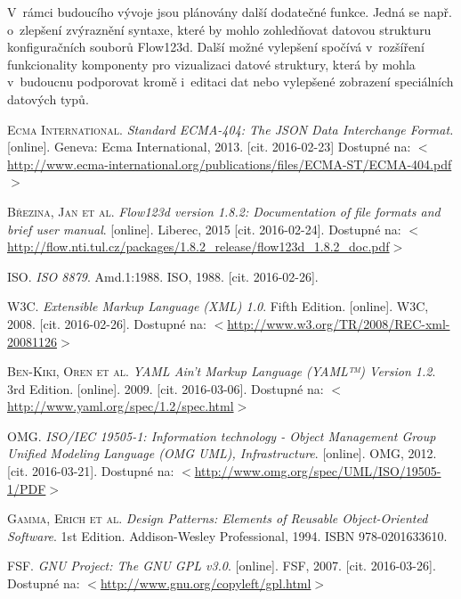 \documentclass[FM,bw,DP]{tulthesis}
\begin{document}
V~rámci budoucího vývoje jsou plánovány další dodatečné funkce. Jedná se např. o~zlepšení zvýraznění syntaxe, které by mohlo zohledňovat datovou strukturu konfiguračních souborů Flow123d. Další možné vylepšení spočívá v~rozšíření funkcionality komponenty pro vizualizaci datové struktury, která by mohla v~budoucnu podporovat kromě i~editaci dat nebo vylepšené zobrazení speciálních datových typů.

\begin{thebibliography}{99}


\textsc{Ecma International.} \textit{Standard ECMA-404: The JSON Data Interchange Format.} [online]. Geneva: Ecma International, 2013. [cit. 2016-02-23] Dostupné na: $<$\url{http://www.ecma-international.org/publications/files/ECMA-ST/ECMA-404.pdf}$>$

\textsc{Březina, Jan et al.} \textit{Flow123d version 1.8.2: Documentation of file formats and brief user manual}. [online]. Liberec, 2015 [cit. 2016-02-24]. Dostupné na: $<$\url{http://flow.nti.tul.cz/packages/1.8.2_release/flow123d_1.8.2_doc.pdf}$>$

\textsc{\acrshort{ISO}.} \textit{ISO 8879}. Amd.1:1988. \acrfull{ISO}, 1988. [cit. 2016-02-26]. 

\textsc{\acrshort{W3C}.} \textit{Extensible Markup Language (XML) 1.0}. Fifth Edition. [online]. \acrfull{W3C}, 2008. [cit. 2016-02-26]. Dostupné na: $<$\url{http://www.w3.org/TR/2008/REC-xml-20081126}$>$

\textsc{Ben-Kiki, Oren et al.} \textit{YAML Ain’t Markup Language (YAML™) Version 1.2}. 3rd Edition. [online]. 2009. [cit. 2016-03-06]. Dostupné na: $<$\url{http://www.yaml.org/spec/1.2/spec.html}$>$

\textsc{\acrshort{OMG}.} \textit{ISO/IEC 19505-1: Information technology - Object Management Group
Unified Modeling Language (OMG UML),
Infrastructure}. [online]. \acrfull{OMG}, 2012. [cit. 2016-03-21]. Dostupné na: $<$\url{http://www.omg.org/spec/UML/ISO/19505-1/PDF}$>$

\textsc{Gamma, Erich et al.} \textit{Design Patterns: Elements of Reusable Object-Oriented Software}. 1st Edition. Addison-Wesley Professional, 1994. ISBN 978-0201633610.

\acrshort{FSF}. \textit{\acrshort{GNU} Project: The \acrshort{GNU} \acrlong{GPL} v3.0}. [online]. \acrfull{FSF}, 2007. [cit. 2016-03-26]. Dostupné na: $<$\url{http://www.gnu.org/copyleft/gpl.html}$>$


\end{thebibliography}
\end{document}

